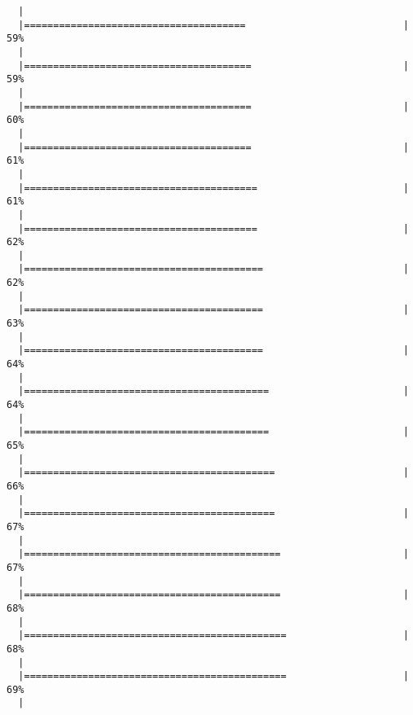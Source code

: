 \begin{knitrout}
\begin{kframe}
\begin{verbatim}
  |                                                                       
  |======================================                           |  59%
  |                                                                       
  |=======================================                          |  59%
  |                                                                       
  |=======================================                          |  60%
  |                                                                       
  |=======================================                          |  61%
  |                                                                       
  |========================================                         |  61%
  |                                                                       
  |========================================                         |  62%
  |                                                                       
  |=========================================                        |  62%
  |                                                                       
  |=========================================                        |  63%
  |                                                                       
  |=========================================                        |  64%
  |                                                                       
  |==========================================                       |  64%
  |                                                                       
  |==========================================                       |  65%
  |                                                                       
  |===========================================                      |  66%
  |                                                                       
  |===========================================                      |  67%
  |                                                                       
  |============================================                     |  67%
  |                                                                       
  |============================================                     |  68%
  |                                                                       
  |=============================================                    |  68%
  |                                                                       
  |=============================================                    |  69%
  |                                                                       

\end{verbatim}
\end{kframe}
\end{knitrout}
